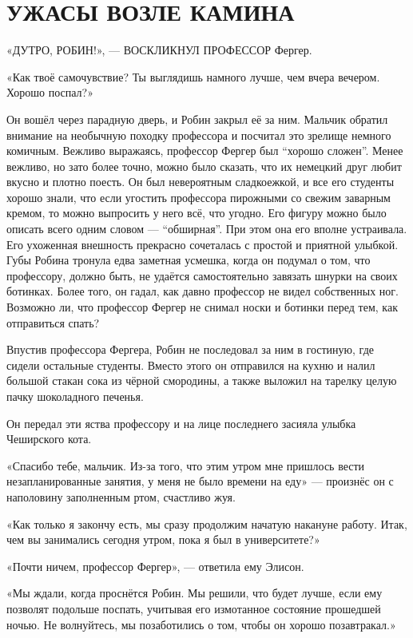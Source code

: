 \documentclass[a5paper, 9pt,
final, openany, twoside=true]{memoir}
\begin{document}
\chapter{УЖАСЫ ВОЗЛЕ КАМИНА}
«Д{ УТРО, РОБИН!», — ВОСКЛИКНУЛ ПРОФЕССОР} Фергер.

«Как твоё самочувствие? Ты выглядишь намного лучше, чем вчера вечером. Хорошо поспал?»

Он вошёл через парадную дверь, и Робин закрыл её за ним. Мальчик обратил внимание на необычную походку профессора и посчитал это зрелище немного комичным. Вежливо выражаясь, профессор Фергер был ``хорошо сложен''. Менее вежливо, но зато более точно, можно было сказать, что их немецкий друг любит вкусно и плотно поесть. Он был невероятным сладкоежкой, и все его студенты хорошо знали, что если угостить профессора пирожными со свежим заварным кремом, то можно выпросить у него всё, что угодно. Его фигуру можно было описать всего одним словом — ``обширная''. При этом она его вполне устраивала. Его ухоженная внешность прекрасно сочеталась с простой и приятной улыбкой. Губы Робина тронула едва заметная усмешка, когда он подумал о том, что профессору, должно быть, не удаётся самостоятельно завязать шнурки на своих ботинках. Более того, он гадал, как давно профессор не видел собственных ног. Возможно ли, что профессор Фергер не снимал носки и ботинки перед тем, как отправиться спать?\bigskip

Впустив профессора Фергера, Робин не последовал за ним в гостиную, где сидели остальные студенты. Вместо этого он отправился на кухню и налил большой стакан сока из чёрной смородины, а также выложил на тарелку целую пачку шоколадного печенья.

Он передал эти яства профессору и на лице последнего засияла улыбка Чеширского кота.

«Спасибо тебе, мальчик. Из-за того, что этим утром мне пришлось вести незапланированные занятия, у меня не было времени на еду» — произнёс он с наполовину заполненным ртом, счастливо жуя.

«Как только я закончу есть, мы сразу продолжим начатую накануне работу. Итак, чем вы занимались сегодня утром, пока я был в университете?»

«Почти ничем, профессор Фергер», — ответила ему Элисон.

«Мы ждали, когда проснётся Робин. Мы решили, что будет лучше, если ему позволят подольше поспать, учитывая его измотанное состояние прошедшей ночью. Не волнуйтесь, мы позаботились о том, чтобы он хорошо позавтракал.»
\end{document}
